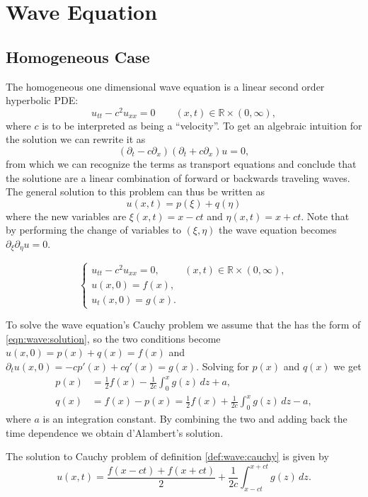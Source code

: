 
\section{Wave Equation}

\subsection{Homogeneous Case}

The homogeneous one dimensional wave equation is a linear second order
hyperbolic PDE:
\[
  u_{tt} - c^2 u_{xx} = 0
  \qquad (x, t) \in \mathbb{R} \times (0, \infty),
\]
where $c$ is to be interpreted as being a ``velocity''. To get an algebraic
intuition for the solution we can rewrite it as
\[
  (\partial_t - c\partial_x)(\partial_t + c\partial_x) u = 0,
\]
from which we can recognize the terms as transport equations and conclude that
the solutione are a linear combination of forward or backwards traveling
waves. The general solution to this problem can thus be written as
\begin{equation} \label{eqn:wave:solution}
  u(x,t) = p(\xi) + q(\eta)
\end{equation}
where the new variables are $\xi(x,t) = x - ct$ and $\eta(x,t) = x + ct$.
Note that by performing the change of variables to $(\xi,\eta)$ the wave
equation becomes $\partial_\xi \partial_\eta u = 0$.

\begin{defn}
  \label{def:wave:cauchy}
  \[
    \begin{cases}
      u_{tt} - c^2 u_{xx} = 0, & (x, t) \in \mathbb{R} \times (0, \infty), \\
      u(x,0) = f(x), \\
      u_t(x,0) = g(x).
    \end{cases}
  \]
\end{defn}

To solve the wave equation's Cauchy problem we assume that the has the form of 
\eqref{eqn:wave:solution}, so the two conditions become $u(x,0) = p(x) + q(x)
= f(x)$ and $\partial_t u(x,0) = -c p'(x) + c q'(x) = g(x)$. Solving for
$p(x)$ and $q(x)$ we get
\begin{align*}
  p(x) &= \frac{1}{2}f(x) - \frac{1}{2c}\int_0^x g(z) \, dz + a, \\
  q(x) &= f(x) - p(x) = \frac{1}{2}f(x) + \frac{1}{2c} \int_0^x g(z) \, dz -a,
\end{align*}
where $a$ is an integration constant. By combining the two and adding back the
time dependence we obtain d'Alambert's solution.
\begin{thm}
  The solution to Cauchy problem of definition \ref{def:wave:cauchy} is given
  by
  \[
    u(x,t) = \frac{f(x-ct) + f(x+ct)}{2} 
      + \frac{1}{2c} \int_{x-ct}^{x+ct} g(z) \,dz.
  \]
\end{thm}


